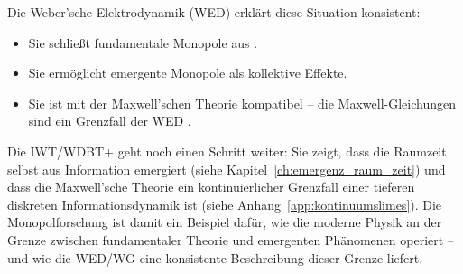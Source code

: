 Die Weber'sche Elektrodynamik (WED) erklärt diese Situation konsistent:
\begin{itemize}
    \item Sie schließt fundamentale Monopole aus \cite{Assis2005}.
    \item Sie ermöglicht emergente Monopole als kollektive Effekte.
    \item Sie ist mit der Maxwell'schen Theorie kompatibel – die Maxwell-Gleichungen sind ein Grenzfall der WED \cite{Assis1994}.
\end{itemize}

Die IWT/WDBT+ geht noch einen Schritt weiter: Sie zeigt, dass die Raumzeit selbst aus Information emergiert (siehe Kapitel~\ref{ch:emergenz_raum_zeit}) und dass die Maxwell'sche Theorie ein kontinuierlicher Grenzfall einer tieferen diskreten Informationsdynamik ist (siehe Anhang~\ref{app:kontinuumslimes}). Die Monopolforschung ist damit ein Beispiel dafür, wie die moderne Physik an der Grenze zwischen fundamentaler Theorie und emergenten Phänomenen operiert – und wie die WED/WG eine konsistente Beschreibung dieser Grenze liefert.